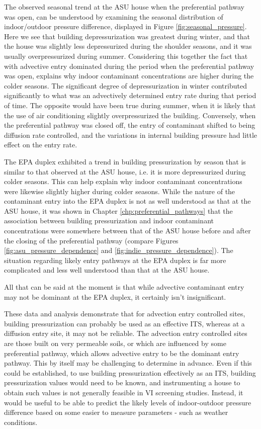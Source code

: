 The observed seasonal trend at the ASU house when the preferential pathway was open, can be understood by examining the seasonal distribution of indoor/outdoor pressure difference, displayed in Figure \ref{fig:seasonal_pressure}.
Here we see that building depressurization was greatest during winter, and that the house was slightly less depressurized during the shoulder seasons, and it was  usually overpressurized during summer.
Considering this together the fact that with advective entry dominated during the period when the preferential pathway was open, explains why indoor contaminant concentrations are higher during the colder seasons.
The significant degree of depressurization in winter contributed significantly to what was an advectively determined entry rate during that period of time.
The opposite would have been true during summer, when it is likely that the use of air conditioning slightly overpressurized the building.
Conversely, when the preferential pathway was closed off, the entry of contaminant shifted to being diffusion rate controlled, and the variations in internal building pressure had little effect on the entry rate.\par

The EPA duplex exhibited a trend in building pressurization by season that is similar to that observed at the ASU house, i.e. it is more depressurized during colder seasons.
This can help explain why indoor contaminant concentrations were likewise slightly higher during colder seasons.
While the nature of the contaminant entry into the EPA duplex is not as well understood as that at the ASU house, it was shown in Chapter \ref{chp:preferential_pathways} that the association between building pressurization and indoor contaminant concentrations were somewhere between that of the ASU house before and after the closing of the preferential pathway (compare Figures \ref{fig:asu_pressure_dependence} and \ref{fig:indie_pressure_dependence}).
The situation regarding likely entry pathways at the EPA duplex is far more complicated and less well understood than that at the ASU house.

All that can be said at the moment is that while advective contaminant entry may not be dominant at the EPA duplex, it certainly isn't insignificant.\par

These data and analysis demonstrate that for advection entry controlled sites, building pressurization can probably be used as an effective ITS, whereas at a diffusion entry site, it may not be reliable.
The advection entry controlled sites are those built on very permeable soils, or which are influenced by some preferential pathway, which allows advective entry to be the dominant entry pathway.
This by itself may be challenging to determine in advance.
Even if this could be established, to use building pressurization effectively as an ITS, building pressurization values would need to be known, and instrumenting a house to obtain such values is not generally feasible in VI screening studies.
Instead, it would be useful to be able to predict the likely levels of indoor-outdoor pressure difference based on some easier to measure parameters - such as weather conditions.\par
